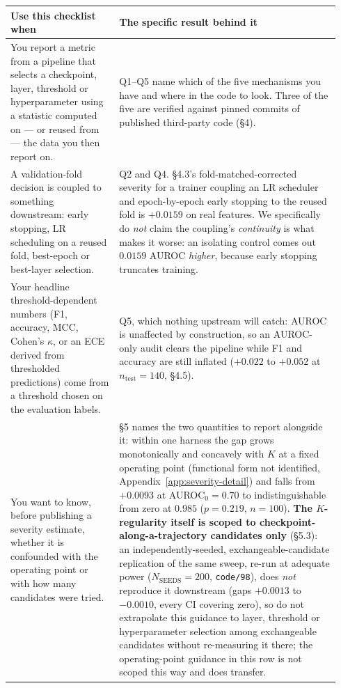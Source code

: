 \documentclass[10pt]{article} %
\begin{document}
\begin{table}[!ht]
\centering
\small
\begin{tabular}{@{}p{0.31\linewidth}p{0.63\linewidth}@{}}
\toprule
Use this checklist when & The specific result behind it \\
\midrule
You report a metric from a pipeline that selects a checkpoint, layer, threshold or hyperparameter using a statistic computed on --- or reused from --- the data you then report on. & Q1--Q5 name which of the five mechanisms you have and where in the code to look. Three of the five are verified against pinned commits of published third-party code (§4). \\
\addlinespace
A validation-fold decision is coupled to something downstream: early stopping, LR scheduling on a reused fold, best-epoch or best-layer selection. & Q2 and Q4. §4.3's fold-matched-corrected severity for a trainer coupling an LR scheduler and epoch-by-epoch early stopping to the reused fold is $+0.0159$ on real features. We specifically do \emph{not} claim the coupling's \emph{continuity} is what makes it worse: an isolating control comes out $0.0159$ AUROC \emph{higher}, because early stopping truncates training. \\
\addlinespace
Your headline threshold-dependent numbers (F1, accuracy, MCC, Cohen's $\kappa$, or an ECE derived from thresholded predictions) come from a threshold chosen on the evaluation labels. & Q5, which nothing upstream will catch: AUROC is unaffected by construction, so an AUROC-only audit clears the pipeline while F1 and accuracy are still inflated ($+0.022$ to $+0.052$ at $n_{\text{test}}=140$, §4.5). \\
\addlinespace
You want to know, before publishing a severity estimate, whether it is confounded with the operating point or with how many candidates were tried. & §5 names the two quantities to report alongside it: within one harness the gap grows monotonically and concavely with $K$ at a fixed operating point (functional form not identified, Appendix~\ref{app:severity-detail}) and falls from $+0.0093$ at AUROC$_0=0.70$ to indistinguishable from zero at $0.985$ ($p=0.219$, $n=100$). \textbf{The $K$-regularity itself is scoped to checkpoint-along-a-trajectory candidates only} (§5.3): an independently-seeded, exchangeable-candidate replication of the same sweep, re-run at adequate power ($N_{\text{SEEDS}}=200$, \texttt{code/98}), does \emph{not} reproduce it downstream (gaps $+0.0013$ to $-0.0010$, every CI covering zero), so do not extrapolate this guidance to layer, threshold or hyperparameter selection among exchangeable candidates without re-measuring it there; the operating-point guidance in this row is not scoped this way and does transfer. \\

\end{tabular}
\end{table}
\end{document}
